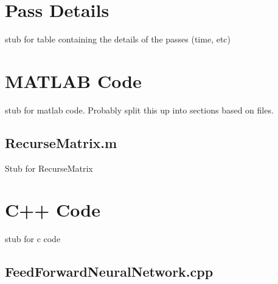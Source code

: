 
\begin{appendices}
\chapter{Pass Details}\label{app:pass_details}
\par stub for table containing the details of the passes (time, etc)
\chapter{MATLAB Code}\label{app:MatlabCode}
\par stub for matlab code. Probably split this up into sections based on files.
\section{RecurseMatrix.m}\label{app:MatlabCode:recurseMatrix}
\par Stub for RecurseMatrix

\chapter{C++ Code} \label{app:CppCode}
\par stub for c code
\section{FeedForwardNeuralNetwork.cpp} \label{app:CppCode:ffnn}
\end{appendices}